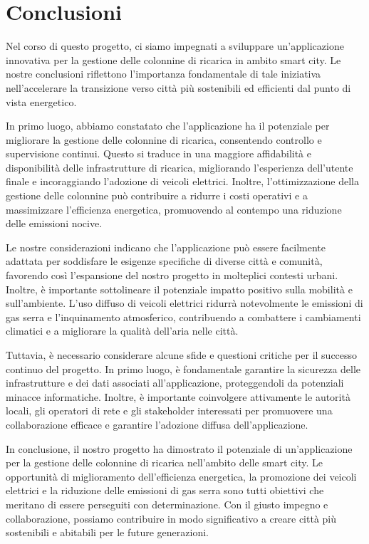 



\section{Conclusioni}

Nel corso di questo progetto, ci siamo impegnati a sviluppare un'applicazione innovativa per
la gestione delle colonnine di ricarica in ambito smart city. Le nostre conclusioni riflettono
l'importanza fondamentale di tale iniziativa nell'accelerare la transizione verso città più
sostenibili ed efficienti dal punto di vista energetico.

In primo luogo, abbiamo constatato che l'applicazione ha il potenziale per migliorare la
gestione delle colonnine di ricarica, consentendo controllo e supervisione
continui. Questo si traduce in una maggiore affidabilità e disponibilità delle infrastrutture
di ricarica, migliorando l'esperienza dell'utente finale e incoraggiando l'adozione di veicoli
elettrici. Inoltre, l'ottimizzazione della gestione delle colonnine può contribuire a ridurre
i costi operativi e a massimizzare l'efficienza energetica, promuovendo al contempo una riduzione
delle emissioni nocive.

Le nostre considerazioni indicano che l'applicazione può essere facilmente adattata per soddisfare
le esigenze specifiche di diverse città e comunità, favorendo così l'espansione del nostro progetto
in molteplici contesti urbani. Inoltre, è importante sottolineare il potenziale impatto positivo sulla
mobilità e sull'ambiente. L'uso diffuso di veicoli elettrici ridurrà notevolmente le emissioni di gas
serra e l'inquinamento atmosferico, contribuendo a combattere i cambiamenti climatici e a migliorare
la qualità dell'aria nelle città.

Tuttavia, è necessario considerare alcune sfide e questioni critiche per il successo continuo
del progetto. In primo luogo, è fondamentale garantire la sicurezza delle infrastrutture e dei
dati associati all'applicazione, proteggendoli da potenziali minacce informatiche. Inoltre,
è importante coinvolgere attivamente le autorità locali, gli operatori di rete e gli stakeholder
interessati per promuovere una collaborazione efficace e garantire l'adozione diffusa dell'applicazione.

In conclusione, il nostro progetto ha dimostrato il potenziale di un'applicazione per
la gestione delle colonnine di ricarica nell'ambito delle smart city. Le opportunità di
miglioramento dell'efficienza energetica, la promozione dei veicoli elettrici e la riduzione
delle emissioni di gas serra sono tutti obiettivi che meritano di essere perseguiti con
determinazione. Con il giusto impegno e collaborazione, possiamo contribuire in modo
significativo a creare città più sostenibili e abitabili per le future generazioni.

